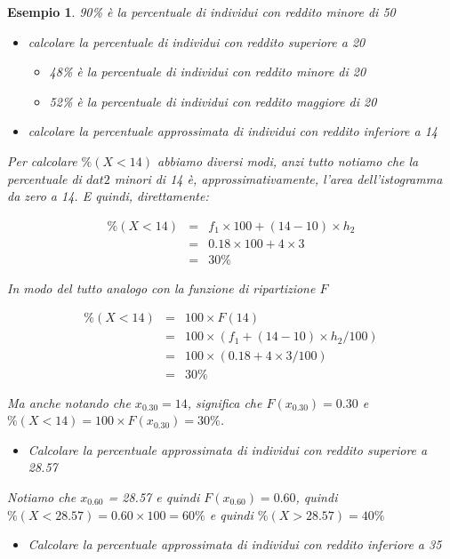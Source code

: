 \documentclass[
  11pt,
]{book}
\providecommand{\tightlist}{%
  \setlength{\itemsep}{0pt}\setlength{\parskip}{0pt}}
\theoremstyle{mytheoremstyle}
\theoremstyle{mydefstyle}
\newtheorem{example}{{Esempio}}[section]
\begin{document}
\begin{example}
90\% è la percentuale di individui con reddito minore di 50

\begin{itemize}
\item
  calcolare la percentuale di individui con reddito superiore a 20

  \begin{itemize}
  \tightlist
  \item
    48\% è la percentuale di individui con reddito minore di 20
  \item
    52\% è la percentuale di individui con reddito maggiore di 20
  \end{itemize}
\item
  calcolare la percentuale approssimata di individui con reddito inferiore a 14
\end{itemize}

Per calcolare \(\%(X<14)\) abbiamo diversi modi, anzi tutto notiamo che la percentuale di \(dat2\) minori di
14 è, approssimativamente, l'area dell'istogramma da zero a 14. E quindi, direttamente:

\begin{eqnarray*}
   \%(X<14) &=&  f_1\times 100+(14-10)\times h_2\\
   &=& 0.18\times 100 + 4\times 3\\
   &=& 30\%
\end{eqnarray*}

In modo del tutto analogo con la funzione di ripartizione \(F\)

\begin{eqnarray*}
   \%(X<14) &=&  100\times F(14)\\
   &=& 100\times(f_1+(14-10)\times h_2/100)\\
   &=& 100\times(0.18 + 4\times 3/100)\\
   &=& 30\%
\end{eqnarray*}

Ma anche notando che \(x_{0.30}=14\), significa che \(F(x_{0.30})=0.30\) e
\(\%(X<14)=100\times F(x_{0.30})=30\%\).

\begin{itemize}
\tightlist
\item
  Calcolare la percentuale approssimata di individui con reddito superiore a 28.57
\end{itemize}

Notiamo che \(x_{0.60}\) = 28.57 e quindi \(F(x_{0.60})=0.60\), quindi
\(\%(X<28.57)=0.60\times 100=60\%\) e quindi \(\%(X>28.57)=40\%\)

\begin{itemize}
\tightlist
\item
  Calcolare la percentuale approssimata di individui con reddito inferiore a 35
\end{itemize}


\end{example}
\end{document}
